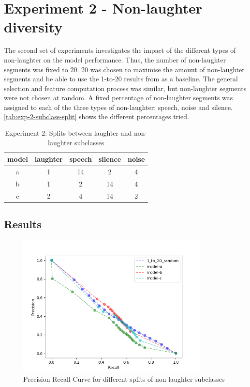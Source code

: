 \documentclass[bsc,frontabs,parskip,deptreport]{infthesis}
\begin{document}
\section{Experiment 2 - Non-laughter diversity}
The second set of experiments investigates the impact of the different types of non-laughter on the model performance. 
Thus, the number of non-laughter segments was fixed to 20. 20 was chosen to maximise the amount of non-laughter segments and be able to use the 1-to-20 results from  as a baseline.
The general selection and feature computation process was similar, but non-laughter segments were not chosen at random. A fixed percentage of non-laughter segments was assigned to each of the three types of non-laughter: speech, noise and silence.
\autoref{tab:exp-2-subclass-split} shows the different percentages tried.

\begin{table}[h!]
    \centering
    \begin{tabular}{|c|c|c|c|c|}
        \hline
        model & laughter & speech & silence & noise \\
        \hline
        a & 1 & 14 & 2 & 4 \\
        b & 1 &  2 & 14 & 4\\
        c & 2 & 4  & 14 & 2\\ 
        \hline
    \end{tabular}
    \caption{Experiment 2: Splits between laughter and non-laughter subclasses}
    \label{tab:exp-2-subclass-split}
\end{table}

\subsection{Results}
\begin{figure}[h!]
    \centering
    \includegraphics[width = 3.8in]{imgs/prec-recall/structured/dev_compare_class_balance_dev_set.png}
    \caption{Precision-Recall-Curve for different splits of non-laughter subclasses}
    \label{fig:prec-recall-struc}
\end{figure}
\end{document}
